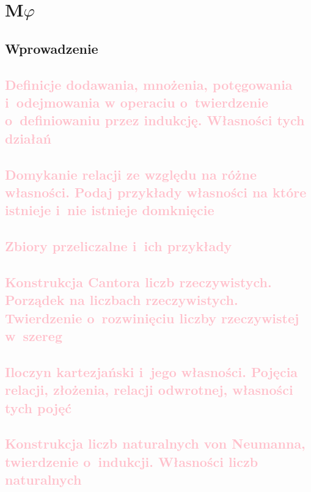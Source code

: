 \chapter{\texorpdfstring{M\(\varphi\)}{MFI}}


\section*{Wprowadzenie}


\section{\textcolor{pink}{Definicje dodawania, mnożenia, potęgowania i~odejmowania w operaciu o~twierdzenie o~definiowaniu przez indukcję. Własności tych działań}}


\section{\textcolor{pink}{Domykanie relacji ze względu na różne własności. Podaj przykłady własności na które istnieje i~nie istnieje domknięcie}}

\section{\textcolor{pink}{Zbiory przeliczalne i~ich przykłady}}

\section{\textcolor{pink}{Konstrukcja Cantora liczb rzeczywistych. Porządek na liczbach rzeczywistych. Twierdzenie o~rozwinięciu liczby rzeczywistej w~szereg}}

\section{\textcolor{pink}{Iloczyn kartezjański i~jego własności. Pojęcia relacji, złożenia, relacji odwrotnej, własności tych pojęć}}
\label{mfi:cartesian_and_relations}


\section{\textcolor{pink}{Konstrukcja liczb naturalnych von Neumanna, twierdzenie o~indukcji. Własności liczb naturalnych}}
\label{mfi:nat_and_induction}


